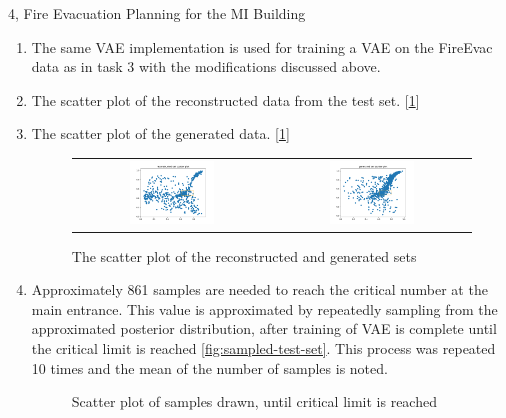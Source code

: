\documentclass[10pt,a4paper]{article}
\begin{document}
\begin{task}{4, Fire Evacuation Planning for the MI Building}
\begin{enumerate}
\begin{figure}[H]
\begin{tabular}{cc}
\end{tabular}
\end{figure}
	\item The same VAE implementation is used for training a VAE on the FireEvac data as in task 3 with the modifications discussed above. 
	\item The scatter plot of the reconstructed data from the test set. [\ref{fig:testing-reconstruction-generated}]
	\item The scatter plot of the generated data. [\ref{fig:testing-reconstruction-generated}]

	\begin{figure}[H]
	\caption{The scatter plot of the reconstructed and generated sets}
	\label{fig:testing-reconstruction-generated} 
	\begin{tabular}{cc}
	\includegraphics[width=0.45\textwidth]{../plots/task4/reconstructed_set_scatter.png} &   \includegraphics[width=0.45\textwidth]{../plots/task4/generated_set_scatter.png} 
	\end{tabular}
	\end{figure}
	\item Approximately 861 samples are needed to reach the critical number at the main entrance. This value is approximated by repeatedly sampling from the approximated posterior distribution, after training of VAE is complete until the critical limit is reached \ref{fig:sampled-test-set}. This process was repeated 10 times and the mean of the number of samples is noted.
	\begin{figure}[H]
		\caption{Scatter plot of samples drawn, until critical limit is reached}

\end{figure}
\end{enumerate}
\end{task}
\end{document}
